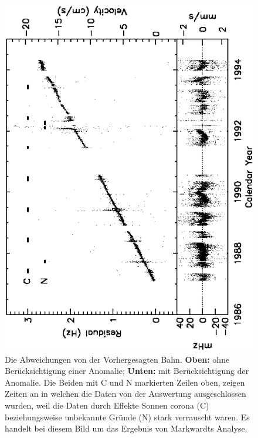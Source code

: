\begin{figure}[htbb]
\begin{minipage}[t]{.6\linewidth}
	\centering
	\includegraphics[width=\linewidth,angle={-90}]{images/M02P10beide}
  \caption{Die Abweichungen von der Vorhergesagten Bahn. {\bf Oben:} ohne Berücksichtigung einer Anomalie; {\bf Unten:} mit Berücksichtigung der Anomalie. Die Beiden mit C und N markierten Zeilen oben, zeigen Zeiten an in welchen die Daten von der Auswertung ausgeschlossen wurden, weil die Daten durch Effekte Sonnen corona (C) beziehungsweise unbekannte Gründe (N) stark verrauscht waren. Es handelt bei diesem Bild um das Ergebnis von Markwardts Analyse\cite{Markwardt2002}.}\label{fig:Markwardvergl}
\end{minipage}
	\centering
 \end{figure}
 
